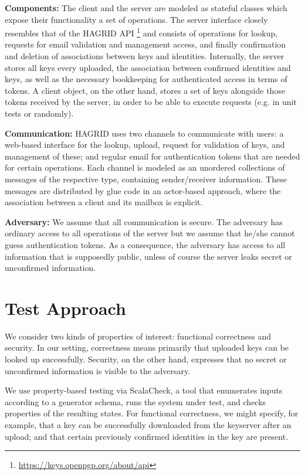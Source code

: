 \documentclass{llncs}
\begin{document}
\textbf{Components:} The client and the server are modeled as stateful classes which expose their functionality a set of operations.
The server interface closely resembles that of the HAGRID API%
    \footnote{\url{https://keys.openpgp.org/about/api}}
and consists of operations for lookup, requests for email validation and management access,
and finally confirmation and deletion of associations between keys and identities.
Internally, the server stores all keys every uploaded, the association between confirmed identities and keys,
as well as the necessary bookkeeping for authenticated access in terms of tokens.
A client object, on the other hand, stores a set of keys alongside those tokens received by the server, in order to be able to execute requests (e.g. in unit tests or randomly).

\textbf{Communication:} HAGRID uses two channels to communicate with users:
a web-based interface for the lookup, upload, request for validation of keys, and management of these;
and regular email for authentication tokens that are needed for certain operations.
Each channel is modeled as an unordered collections of messages of the respective type, containing sender/receiver information.
These messages are distributed by glue code in an actor-based approach,
where the association between a client and its mailbox is explicit.

\textbf{Adversary:} We assume that all communication is secure.
The adversary has ordinary access to all operations of the server but we assume that he/she cannot guess authentication tokens.
As a consequence, the adversary has access to all information that is supposedly public,
unless of course the server leaks secret or unconfirmed information.

\section{Test Approach}

We consider two kinds of properties of interest: functional correctness and security.
In our setting, correctness means primarily that uploaded keys can be looked up successfully.
Security, on the other hand, expresses that no secret or unconfirmed information is visible to the adversary.

We use property-based testing via ScalaCheck, a tool that enumerates inputs according to a generator schema,
runs the system under test, and checks properties of the resulting states.
For functional correctness, we might specify, for example, that a key can be successfully downloaded from the keyserver after an upload;
and that certain previously confirmed identities in the key are present.
\end{document}
